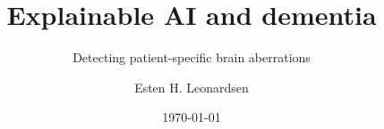 \documentclass{beamer}
\title{Explainable AI and dementia}
\subtitle{Detecting patient-specific brain aberrations}
\date{\today}
\author{Esten H. Leonardsen}
\begin{document}
    \begin{frame}
        \titlepage
    \end{frame}

    
    
    
\end{document}
